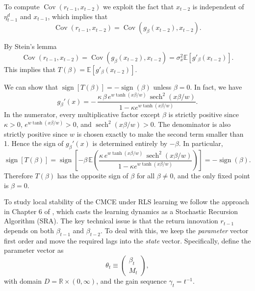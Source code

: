 \documentclass[11pt]{article}
\begin{document}
To compute $\operatorname{Cov}(r_{t-1}, x_{t-2})$ we exploit the fact that $x_{t-2}$ is independent of $\eta^d_{t-1}$ and $x_{t-1}$, which implies that
\begin{equation}
    \operatorname{Cov}(r_{t-1}, x_{t-2}) = \operatorname{Cov}\left(g_{\beta}(x_{t-2}), x_{t-2}\right).
\end{equation}

By Stein's lemma
\begin{equation}
    \operatorname{Cov}(r_{t-1}, x_{t-2}) = \operatorname{Cov}(g_{\beta}(x_{t-2}), x_{t-2}) = \sigma^2_x \mathbb{E}\left[g'_{\beta}(x_{t-2})\right].
\end{equation}
This implies that $T(\beta) = \mathbb{E}\left[g'_{\beta}(x_{t-2})\right]$.

We can show that  $\operatorname{sign}\left[T(\beta)\right] = - \operatorname{sign}(\beta)$ unless $\beta = 0$. In fact, we have
\begin{equation}
    g_{\beta}'(x)
= -\,\frac{\kappa\,\beta\, e^{w\tanh(x \beta/w)}\, \operatorname{sech}^2(x \beta/w)}
        {1 - \kappa e^{w\tanh(x \beta/w)}}.
\end{equation}
In the numerator, every multiplicative factor except $\beta$ is strictly positive since
$\kappa>0$, $e^{w\tanh(x \beta/w)}>0$, and $\operatorname{sech}^2(x \beta/w)>0$.
The denominator is also strictly positive since $w$ is chosen exactly to make the second term smaller than 1.
Hence the sign of $g_\beta'(x)$ is determined entirely by $-\beta$.
In particular,
\begin{equation}
    \operatorname{sign}\left[T(\beta)\right] 
    = \operatorname{sign}\left[ - \beta \,\mathbb{E}\left(\frac{\kappa\, e^{w\tanh(x \beta/w)}\, \operatorname{sech}^2(x \beta/w)}
        {1 - \kappa e^{w\tanh(x \beta/w)}}\right)\right] = - \operatorname{sign}(\beta).
\end{equation}
Therefore $T(\beta)$ has the opposite sign of $\beta$ for all $\beta \neq 0$, and the only fixed point is $\beta = 0$.

To study local stability of the CMCE under RLS learning we follow the approach in Chapter 6 of \cite{GeorgeWEvans2001},
which casts the learning dynamics as a Stochastic Recursion Algorithm (SRA).
The key technical issue is that the return innovation $r_{t-1}$ depends on both $\beta_{t-1}$ and $\beta_{t-2}$. 
To deal with this, we keep the \emph{parameter} vector first order and move the required lags into the \emph{state} vector. Specifically, define the parameter vector as
\[
\theta_t \equiv 
\begin{pmatrix}
\beta_t\\
M_t
\end{pmatrix},\]
with domain $D=\mathbb R\times (0,\infty)$, and the gain sequence $\gamma_t=t^{-1}$.
\end{document}
